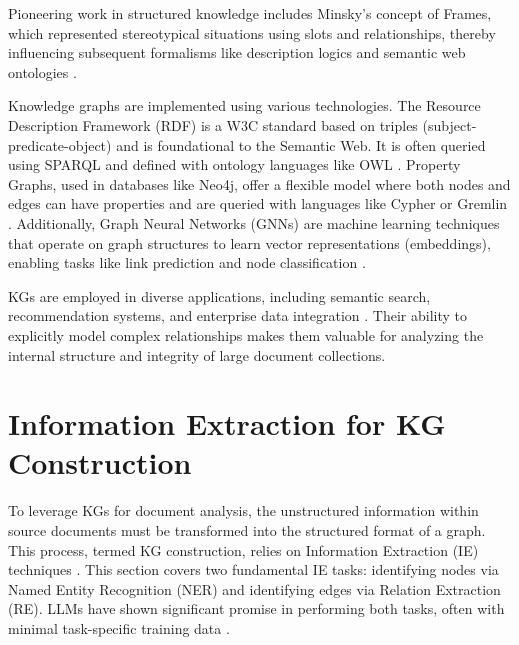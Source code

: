 Pioneering work in structured knowledge includes Minsky's concept of Frames, which represented stereotypical situations using slots and relationships, thereby influencing subsequent formalisms like description logics and semantic web ontologies \parencite{RefWorks:RefID:78-minsky1974framework}.

Knowledge graphs are implemented using various technologies. The Resource Description Framework (RDF) is a W3C standard based on triples (subject-predicate-object) and is foundational to the Semantic Web. It is often queried using SPARQL and defined with ontology languages like OWL \parencite{RefWorks:RefID:109-2025rdf, RefWorks:RefID:111-kumar2013querying, RefWorks:RefID:110-hitzler2009foundations}. Property Graphs, used in databases like Neo4j, offer a flexible model where both nodes and edges can have properties and are queried with languages like Cypher or Gremlin \parencite{RefWorks:RefID:114-fernandes2018graph}. Additionally, Graph Neural Networks (GNNs) are machine learning techniques that operate on graph structures to learn vector representations (embeddings), enabling tasks like link prediction and node classification \parencite{RefWorks:RefID:7-gupta2021graph, RefWorks:RefID:47-scarselli2009graph, RefWorks:RefID:49-wang2024graph}.

KGs are employed in diverse applications, including semantic search, recommendation systems, and enterprise data integration \parencite{RefWorks:RefID:102-hogan2021knowledge, RefWorks:RefID:118-ji2022survey, RefWorks:RefID:120-fensel2020knowledge}. Their ability to explicitly model complex relationships makes them valuable for analyzing the internal structure and integrity of large document collections.

\section{Information Extraction for KG Construction}
To leverage KGs for document analysis, the unstructured information within source documents must be transformed into the structured format of a graph. This process, termed KG construction, relies on Information Extraction (IE) techniques \parencite{RefWorks:RefID:121-zhong2024comprehensive, RefWorks:RefID:122-kolluru2020imojie}. This section covers two fundamental IE tasks: identifying nodes via Named Entity Recognition (NER) and identifying edges via Relation Extraction (RE). LLMs have shown significant promise in performing both tasks, often with minimal task-specific training data \parencite{RefWorks:RefID:107-benjira2025automated}.

